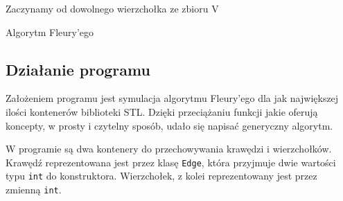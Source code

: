 \documentclass[11pt, a4paper]{article}
\begin{document}
\begin{algorithm}[H]
 \label{Wejście}
 Zaczynamy od dowolnego wierzchołka ze zbioru V\;
 \caption{Algorytm Fleury'ego}
\end{algorithm}

\subsection{Działanie programu}
Założeniem programu jest symulacja algorytmu Fleury'ego dla jak największej ilości kontenerów biblioteki STL. Dzięki przeciążaniu funkcji jakie oferują koncepty, w prosty i czytelny sposób, udało się napisać generyczny algorytm.

W programie są dwa kontenery do przechowywania krawędzi i wierzchołków. Krawędź reprezentowana jest przez klasę \verb#Edge#, która przyjmuje dwie wartości typu \verb#int# do konstruktora. Wierzchołek, z kolei reprezentowany jest przez zmienną \verb#int#. 
\end{document}
